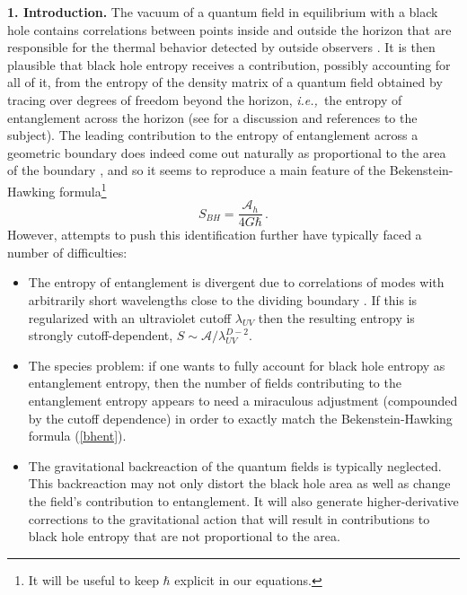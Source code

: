 \documentclass[12pt]{article}
\newcommand{\beq}{\begin{equation}}
\newcommand{\eeq}{\end{equation}}
\newcommand{\ie}{{\it i.e.,}\ }
\newcommand{\reef}[1]{(\ref{#1})}
\begin{document}
\noindent\textbf{1. Introduction.} The vacuum of a quantum field in
equilibrium with a black hole contains correlations between points
inside and outside the horizon that are responsible for the thermal
behavior detected by outside observers \cite{unruh,israel}. It is then
plausible that black hole entropy receives a contribution, possibly
accounting for all of it, from the entropy of the density matrix of a
quantum field obtained by tracing over degrees of freedom beyond
the horizon, \ie the entropy of entanglement across the horizon
\cite{bkls} (see \cite{jac} for a discussion and references to the
subject). The leading contribution to the entropy of entanglement across
a geometric boundary does indeed come out naturally as proportional to
the area of the boundary \cite{bkls,sred}, and so it seems to reproduce
a main feature of the Bekenstein-Hawking formula\footnote{It will be
useful to keep $\hbar$ explicit in our equations.}
\beq\label{bhent}
S_{BH}=\frac{\mathcal{A}_{h}}{4G\hbar}\,. 
\eeq 
However, attempts to push this
identification further have typically faced a number of difficulties:

\begin{itemize} 

\item The entropy of entanglement is divergent due to correlations of
modes with arbitrarily short wavelengths close to the dividing boundary
\cite{bkls,thooft,sred}. If this is regularized with an ultraviolet
cutoff $\lambda_{UV}$ then the resulting entropy is strongly
cutoff-dependent, $S\sim \mathcal{A}/\lambda_{UV}^{D-2}$.

\item The species problem: if one wants to fully account for black hole
entropy as entanglement entropy, then the number of fields contributing
to the entanglement entropy appears to need a miraculous adjustment
(compounded by the cutoff dependence) in order to exactly match the
Bekenstein-Hawking formula \reef{bhent}.

\item The gravitational backreaction of the quantum fields is typically
neglected. This backreaction may not only distort the black hole area as
well as change the field's contribution to entanglement. It will also
generate higher-derivative corrections to the gravitational action that
will result in contributions to black hole entropy that are not
proportional to the area. 

\end{itemize}
\end{document}
